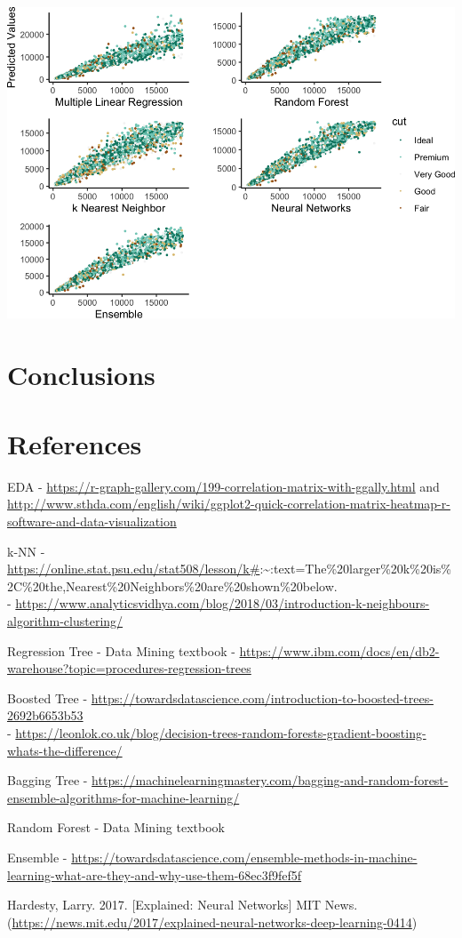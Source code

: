 \documentclass[
  paper=a4,
  ,captions=tableheading
]{scrartcl}
\begin{document}
\begin{center}\includegraphics{Diamonds_PDF_files/figure-latex/Summ Cut Plots-1} \end{center}

\hypertarget{conclusions}{%
\section{Conclusions}\label{conclusions}}

\hypertarget{references}{%
\section{References}\label{references}}

EDA -
\url{https://r-graph-gallery.com/199-correlation-matrix-with-ggally.html}
and
\url{http://www.sthda.com/english/wiki/ggplot2-quick-correlation-matrix-heatmap-r-software-and-data-visualization}

k-NN -
\url{https://online.stat.psu.edu/stat508/lesson/k\#}:\textasciitilde:text=The\%20larger\%20k\%20is\%2C\%20the,Nearest\%20Neighbors\%20are\%20shown\%20below.\\
-
\url{https://www.analyticsvidhya.com/blog/2018/03/introduction-k-neighbours-algorithm-clustering/}

Regression Tree - Data Mining textbook -
\url{https://www.ibm.com/docs/en/db2-warehouse?topic=procedures-regression-trees}

Boosted Tree -
\url{https://towardsdatascience.com/introduction-to-boosted-trees-2692b6653b53}\\
-
\url{https://leonlok.co.uk/blog/decision-trees-random-forests-gradient-boosting-whats-the-difference/}

Bagging Tree -
\url{https://machinelearningmastery.com/bagging-and-random-forest-ensemble-algorithms-for-machine-learning/}

Random Forest - Data Mining textbook

Ensemble -
\url{https://towardsdatascience.com/ensemble-methods-in-machine-learning-what-are-they-and-why-use-them-68ec3f9fef5f}

Hardesty, Larry. 2017. {[}Explained: Neural Networks{]} MIT News.
(\url{https://news.mit.edu/2017/explained-neural-networks-deep-learning-0414})
\end{document}
